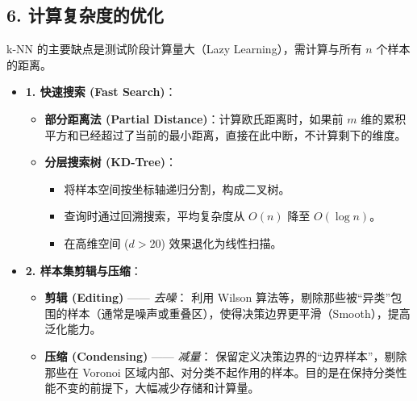\documentclass[a4paper, 11pt]{ctexart}
\begin{document}
\subsection{6. 计算复杂度的优化}
k-NN 的主要缺点是测试阶段计算量大（Lazy Learning），需计算与所有 $n$ 个样本的距离。

\begin{itemize}
    \item \textbf{1. 快速搜索 (Fast Search)}：
    \begin{itemize}
        \item \textbf{部分距离法 (Partial Distance)}：计算欧氏距离时，如果前 $m$ 维的累积平方和已经超过了当前的最小距离，直接在此中断，不计算剩下的维度。
        \item \textbf{分层搜索树 (KD-Tree)}：
        \begin{itemize}
            \item 将样本空间按坐标轴递归分割，构成二叉树。
            \item 查询时通过回溯搜索，平均复杂度从 $O(n)$ 降至 $O(\log n)$。
            \item 在高维空间 ($d > 20$) 效果退化为线性扫描。
        \end{itemize}
    \end{itemize}

    \item \textbf{2. 样本集剪辑与压缩}：
    \begin{itemize}
        \item \textbf{剪辑 (Editing)} —— \textit{去噪}：
        利用 Wilson 算法等，剔除那些被“异类”包围的样本（通常是噪声或重叠区），使得决策边界更平滑（Smooth），提高泛化能力。
        \item \textbf{压缩 (Condensing)} —— \textit{减量}：
        保留定义决策边界的“边界样本”，剔除那些在 Voronoi 区域内部、对分类不起作用的样本。目的是在保持分类性能不变的前提下，大幅减少存储和计算量。
    \end{itemize}
\end{itemize}
\end{document}
